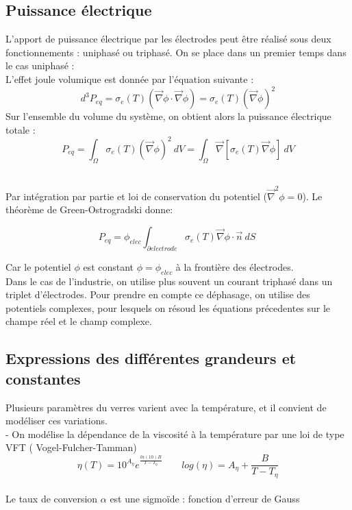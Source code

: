 \documentclass[12pt, a4paper, french, BCOR = 0pt, DIV = 10]{scrartcl}
\begin{document}
	\subsection{Puissance électrique}
	\raggedright
    L'apport de puissance électrique par les électrodes peut être réalisé sous deux fonctionnements : uniphasé ou triphasé.
	On se place dans un premier temps dans le cas uniphasé :\\ [0.2 cm ]
    L'effet joule volumique est donnée par l'équation suivante :
    $$ d^3P_{eq} = \sigma_{e}(T)(\vec \nabla\phi \cdot \vec \nabla\phi) = \sigma_{e}(T)(\vec \nabla\phi)^2$$
    Sur l'ensemble du volume du système, on obtient alors la puissance électrique totale : 
	$$P_{eq}=\int_\Omega \sigma_{e}(T)(\vec \nabla\phi)^2~dV  = \int_\Omega \vec \nabla[\sigma_{e}(T)\vec \nabla\phi]~dV $$\\
	\raggedright
	Par intégration par partie et loi de conservation du potentiel ($ \vec{\nabla}^2 \phi = 0 $). Le théorème de Green-Ostrogradski donne: 
	
	$$ P_{eq}=\phi_{elec} \int_{\partial electrode} \sigma_{e}(T)\vec \nabla\phi \cdot \vec{n}~dS\ $$
    
	Car le potentiel $\phi$ est constant $\phi=\phi_{elec} $ à la frontière des électrodes. \\

    Dans le cas de l'industrie, on utilise plus souvent un courant triphasé dans un triplet d'électrodes. Pour prendre en compte ce déphasage, on utilise des potentiels complexes, pour lesquels on résoud les équations précedentes sur le champe réel et le champ complexe.

    
	\subsection{ Expressions des différentes grandeurs et constantes}
    Plusieurs paramètres du verres varient avec la température, et il convient de modéliser ces variations.\\ [0,5 cm]
	
	- On modélise la dépendance de la viscosité à la température par une loi de type VFT ( Vogel-Fulcher-Tamman) \\
	$$
	\eta (T)  = 10^{A_{\eta}} e^{\frac{ln(10) B}{T-T_{\eta}}} ~~~~~~~~~ log(\eta) = A_{\eta} + \frac{B}{T-T_{\eta}}
	$$\\ [0,5 cm]

    
	Le taux de conversion $\alpha$ est une sigmoïde : fonction d'erreur de Gauss\\ [0.3cm]
	
\end{document}
